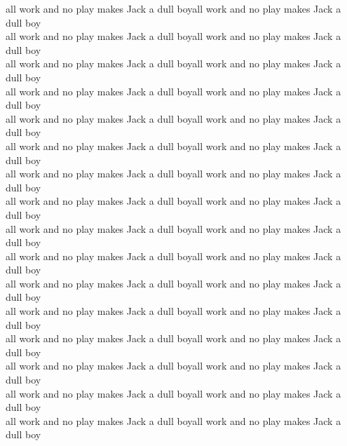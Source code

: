 \begin{ntquote}
all work and no play makes Jack a dull boy\quad\quad all work and no play makes Jack a dull boy\\
all work and no play makes Jack a dull boy\quad\quad all work and no play makes Jack a dull boy\\
all work and no play makes Jack a dull boy\quad\quad all work and no play makes Jack a dull boy\\
all work and no play makes Jack a dull boy\quad\quad all work and no play makes Jack a dull boy\\
all work and no play makes Jack a dull boy\quad\quad all work and no play makes Jack a dull boy\\
all work and no play makes Jack a dull boy\quad\quad all work and no play makes Jack a dull boy\\
all work and no play makes Jack a dull boy\quad\quad all work and no play makes Jack a dull boy\\
all work and no play makes Jack a dull boy\quad\quad all work and no play makes Jack a dull boy\\
all work and no play makes Jack a dull boy\quad\quad all work and no play makes Jack a dull boy\\
all work and no play makes Jack a dull boy\quad\quad all work and no play makes Jack a dull boy\\
all work and no play makes Jack a dull boy\quad\quad all work and no play makes Jack a dull boy\\
all work and no play makes Jack a dull boy\quad\quad all work and no play makes Jack a dull boy\\
all work and no play makes Jack a dull boy\quad\quad all work and no play makes Jack a dull boy\\
all work and no play makes Jack a dull boy\quad\quad all work and no play makes Jack a dull boy\\
all work and no play makes Jack a dull boy\quad\quad all work and no play makes Jack a dull boy\\
all work and no play makes Jack a dull boy\quad\quad all work and no play makes Jack a dull boy\\
\end{ntquote}